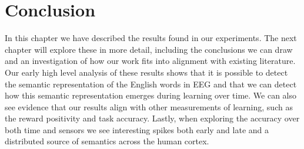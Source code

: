 \section{Conclusion}

In this chapter we have described the results found in our experiments. The 
next chapter will explore these in more detail, including the conclusions we 
can draw and an investigation of how our work fits into alignment with existing 
literature. Our early high level analysis of these results shows that it is 
possible to detect the semantic representation of the English words in EEG and 
that we can detect how this semantic representation emerges during learning 
over time. We can also see evidence that our results align with other 
measurements of learning, such as the reward positivity and task accuracy.  
Lastly, when exploring the \tvt accuracy over both time and sensors we see 
interesting spikes both early and late and a distributed source of semantics 
across the human cortex.

